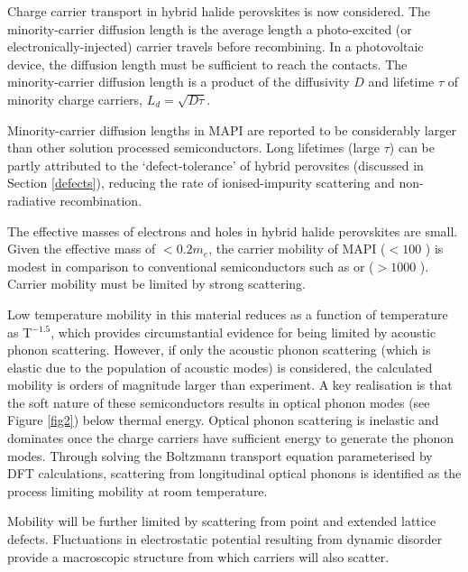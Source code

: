 Charge carrier transport in hybrid halide perovskites is now considered.
The minority-carrier diffusion length is the average length a photo-excited (or electronically-injected) carrier travels before recombining. 
In a photovoltaic device, the diffusion length must be sufficient to reach the contacts.
The minority-carrier diffusion length is a product of the diffusivity $D$ and lifetime $\tau$ of minority charge carriers, $L_d = \sqrt{D\tau}$.

Minority-carrier diffusion lengths in MAPI are reported to be considerably larger than other solution processed semiconductors.\autocite{Li2015zz}
%
Long lifetimes (large $\tau$) can be partly attributed to the `defect-tolerance' of hybrid perovsites (discussed in Section \ref{defects}), reducing the rate of ionised-impurity scattering and non-radiative recombination.  

The effective masses of electrons and holes in hybrid halide perovskites are small.
Given the effective mass of $< 0.2 m_e$,  the carrier mobility of MAPI ($< 100$ \mob) is modest in comparison to conventional semiconductors such as  or  ($> 1000$ \mob).\autocite{Stranks2015b}
Carrier mobility must be limited by strong scattering.

Low temperature mobility in this material reduces as a function of temperature as T$^{-1.5}$, which provides circumstantial evidence for being limited by acoustic phonon scattering.\autocite{Karakus2015,Yi2016a}
However, if only the acoustic phonon scattering (which is elastic due to the population of acoustic modes) is considered, the calculated mobility is orders of magnitude larger than experiment. 
A key realisation is that the soft nature of these semiconductors results in optical phonon modes (see Figure \ref{fig2}) below thermal energy.\autocite{Brivio2015a,PerezOsorio2015a}
Optical phonon scattering is inelastic and dominates once the charge carriers have sufficient energy to generate the phonon modes.\autocite{Leguy2016} 
Through solving the Boltzmann transport equation parameterised by DFT calculations, scattering from longitudinal optical phonons is identified as the process limiting mobility at room temperature.\autocite{Wright2016,Filippetti2016}

Mobility will be further limited by scattering from point and extended lattice defects.\autocite{Ball2016}
Fluctuations in electrostatic potential resulting from dynamic disorder provide a macroscopic structure from which carriers will also scatter.\autocite{Frost2014,Ma2014d}

